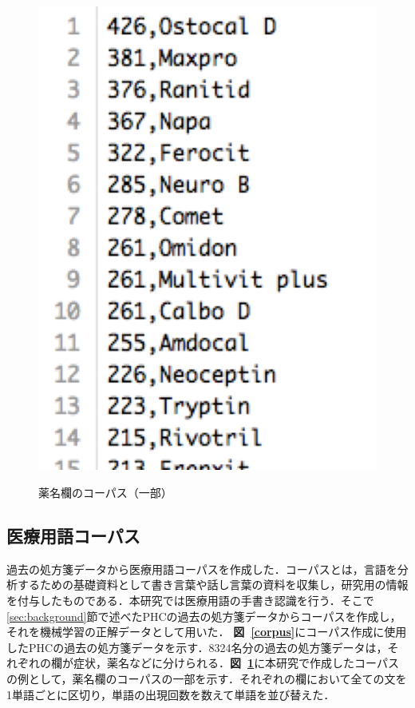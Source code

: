 \begin{figure}[tb]
  \begin{center}
     \includegraphics[keepaspectratio,scale=0.5]{img/corpus_example.png}\\
  \end{center}
 \caption{薬名欄のコーパス（一部）}
 \label{corpus_example}
\end{figure}

\subsection{医療用語コーパス}
\label{ssec:corpus}
過去の処方箋データから医療用語コーパスを作成した．コーパスとは，言語を分析するための基礎資料として書き言葉や話し言葉の資料を収集し，研究用の情報を付与したものである．本研究では医療用語の手書き認識を行う．そこで \ref{sec:background}節で述べたPHCの過去の処方箋データからコーパスを作成し，それを機械学習の正解データとして用いた． \textbf{図~\ref{corpus}}にコーパス作成に使用したPHCの過去の処方箋データを示す．8324名分の過去の処方箋データは，それぞれの欄が症状，薬名などに分けられる．\textbf{図~\ref{corpus_example}}に本研究で作成したコーパスの例として，薬名欄のコーパスの一部を示す．それぞれの欄において全ての文を1単語ごとに区切り，単語の出現回数を数えて単語を並び替えた．

